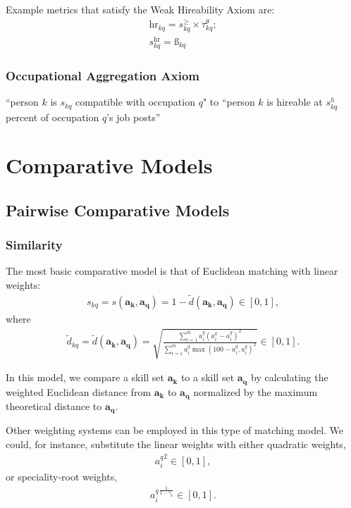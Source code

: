 \documentclass{elsarticle} %
\begin{document}
Example metrics that satisfy the Weak Hireability Axiom are:
\begin{gather}
    \text{hr}_{kq} =
    s_{kq}^{\geq} \times
    \ddot{\tau}_{kq}^{\theta};\\
    s_{kq}^{\text{hr}} = \textit{\ss}_{kq}
\end{gather}

\subsubsection{Occupational Aggregation Axiom}
``person $k$ is $s_{kq}$ compatible with occupation $q$" to ``person $k$ is hireable at $s_{kq}^{h}$ percent of occupation $q$'s job posts''


\section{Comparative Models}
\subsection{Pairwise Comparative Models}
\subsubsection{Similarity}
The most basic comparative model is that of Euclidean matching with linear
weights:
\begin{gather}
    s_{kq} =
    s(\boldsymbol{a_k}, \boldsymbol{a_q}) =
    1 - \tilde{d}(\boldsymbol{a_k}, \boldsymbol{a_q})
    \in [0,1]
    ,
\end{gather}
where
\begin{gather}
    \tilde{d}_{kq} =
    \tilde{d}(\boldsymbol{a_k}, \boldsymbol{a_q}) =
    \sqrt{
    \frac{
    \sum_{i = 1}^{m}{
    a_{i}^{q} (a_{i}^{k} - a_{i}^{q})^2
    }
    }{
    \sum_{i = 1}^{m}{
    a_{i}^{q} \max(100 - a_{i}^{q}, a_{i}^{q})^2
    }
    }
    }
    \in [0,1]
    .
\end{gather}

In this model, we compare a skill set $\boldsymbol{a_k}$ to a skill set
$\boldsymbol{a_q}$ by calculating the weighted Euclidean distance from
$\boldsymbol{a_k}$ to $\boldsymbol{a_q}$ normalized by the maximum theoretical
distance to $\boldsymbol{a_q}$.

Other weighting systems can be employed in this type of matching model. We
could, for instance, substitute the linear weights with either quadratic
weights,
\begin{gather}
    {a_{i}^{q}} ^ 2
    \in [0,1]
    ,
\end{gather}
or speciality-root weights,
\begin{gather}
    {a_{i}^{q}} ^ {
        \frac{1}{1 - \gamma_k}
    }
    \in [0,1]
    .
\end{gather}
\end{document}
